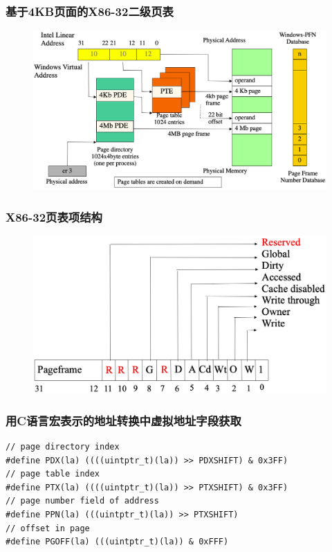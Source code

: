 \begin{frame}
    \frametitle{基于4KB页面的X86-32二级页表}
    \begin{figure}
    \includegraphics[width=0.8\linewidth]{figs/x86-32-addr-translation.png}
    \end{figure}
\end{frame}
% 
% 
% 
\begin{frame}
    \frametitle{X86-32页表项结构}
    \begin{figure}
    \includegraphics[width=0.8\linewidth]{figs/x86-32-page-tabel-entry.png}
    \end{figure}
\end{frame}
% 
% 
\begin{frame}
    \frametitle{用C语言宏表示的地址转换中虚拟地址字段获取}
    \begin{block}{}
    \begin{verbatim}
// page directory index
#define PDX(la) ((((uintptr_t)(la)) >> PDXSHIFT) & 0x3FF)
// page table index
#define PTX(la) ((((uintptr_t)(la)) >> PTXSHIFT) & 0x3FF)
// page number field of address
#define PPN(la) (((uintptr_t)(la)) >> PTXSHIFT)
// offset in page
#define PGOFF(la) (((uintptr_t)(la)) & 0xFFF)
    \end{verbatim}
    \end{block}
\end{frame}
